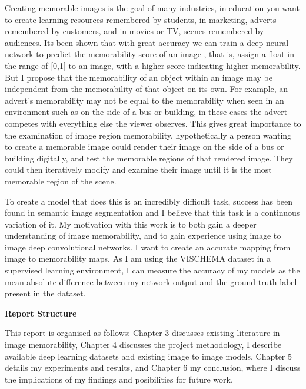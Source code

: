 \documentclass{UoYCSproject}
\begin{document}
Creating memorable images is the goal of many industries, in education you want to create learning resources remembered by students, in marketing, adverts remembered by customers, and in movies or TV, scenes remembered by audiences. Its been shown that with great accuracy we can train a deep neural network to predict the memorability score of an image \cite{Isola2011, IsolaParikhTorralbaOliva2011, ICCV15_Khosla, isola2014memorability},
that is, assign a float in the range of [0,1] to an image, with a higher score indicating higher memorability. But I propose that the memorability of an object within an image may be independent from the memorability of that object on its own. For example, an advert's memorability may not be equal to the memorability when seen in an environment such as on the side of a bus or building, in these cases the advert competes with everything else the viewer observes. This gives great importance to the examination of image region memorability, hypothetically a person wanting to create a memorable image could render their image on the side of a bus or building digitally, and test the memorable regions of that rendered image. They could then iteratively modify and examine their image until it is the most memorable region of the scene.


To create a model that does this is an incredibly difficult task, success has been found in semantic image segmentation \cite{wang2023internimage} and I believe that this task is a continuous variation of it. My motivation with this work is to both gain a deeper understanding of image memorability, and to gain experience using image to image deep convolutional networks. I want to create an accurate mapping from image to memorability maps. As I am using the VISCHEMA dataset in a supervised learning environment, I can measure the accuracy of my models as the mean absolute difference between my network output and the ground truth label present in the dataset.

\textbf{Report Structure}

This report is organised as follows: Chapter 3 discusses existing literature in image memorability, Chapter 4 discusses the project methodology, I describe available deep learning datasets and existing image to image models, Chapter 5 details my experiments and results, and Chapter 6 my conclusion, where I discuss the implications of my findings and posibilities for future work.    
\end{document}
